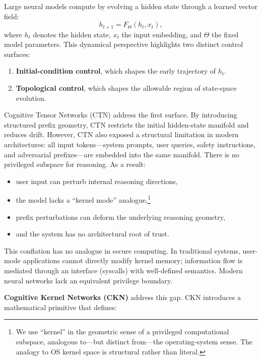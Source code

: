 \documentclass[11pt,a4paper]{article}
\begin{document}
Large neural models compute by evolving a hidden state through a learned vector field:
\begin{equation}
h_{t+1} = F_\Theta(h_t, x_t),
\end{equation}
where $h_t$ denotes the hidden state, $x_t$ the input embedding, and $\Theta$ the fixed model parameters. This dynamical perspective highlights two distinct control surfaces:

\begin{enumerate}
    \item \textbf{Initial-condition control}, which shapes the early trajectory of $h_t$.
    \item \textbf{Topological control}, which shapes the allowable region of state-space evolution.
\end{enumerate}

Cognitive Tensor Networks (CTN) address the first surface. By introducing structured prefix geometry, CTN restricts the initial hidden-state manifold and reduces drift. However, CTN also exposed a structural limitation in modern architectures: all input tokens---system prompts, user queries, safety instructions, and adversarial prefixes---are embedded into the same manifold. There is no privileged subspace for reasoning. As a result:

\begin{itemize}
    \item user input can perturb internal reasoning directions,
    \item the model lacks a ``kernel mode'' analogue,\footnote{We use ``kernel'' in the geometric sense of a privileged computational subspace, analogous to---but distinct from---the operating-system sense. The analogy to OS kernel space is structural rather than literal.}
    \item prefix perturbations can deform the underlying reasoning geometry,
    \item and the system has no architectural root of trust.
\end{itemize}

This conflation has no analogue in secure computing. In traditional systems, user-mode applications cannot directly modify kernel memory; information flow is mediated through an interface (syscalls) with well-defined semantics. Modern neural networks lack an equivalent privilege boundary.

\textbf{Cognitive Kernel Networks (CKN)} address this gap. CKN introduces a mathematical primitive that defines:
\end{document}
